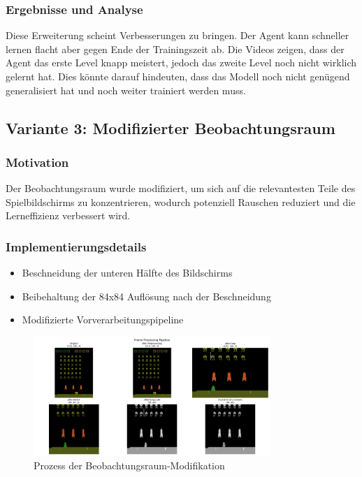 \documentclass{article}
\begin{document}
\subsubsection{Ergebnisse und Analyse}
Diese Erweiterung scheint Verbesserungen zu bringen. Der Agent kann schneller lernen flacht aber gegen Ende der Trainingszeit ab. Die Videos zeigen, dass der Agent das erste Level knapp meistert, jedoch das zweite Level noch nicht wirklich gelernt hat. Dies könnte darauf hindeuten, dass das Modell noch nicht genügend generalisiert hat und noch weiter trainiert werden muss.

\subsection{Variante 3: Modifizierter Beobachtungsraum}
\subsubsection{Motivation}
Der Beobachtungsraum wurde modifiziert, um sich auf die relevantesten Teile des Spielbildschirms zu konzentrieren, wodurch potenziell Rauschen reduziert und die Lerneffizienz verbessert wird.

\subsubsection{Implementierungsdetails}
\begin{itemize}
    \item Beschneidung der unteren Hälfte des Bildschirms
    \item Beibehaltung der 84x84 Auflösung nach der Beschneidung
    \item Modifizierte Vorverarbeitungspipeline
\end{itemize}

\begin{figure}[H]
    \centering
    \includegraphics[width=0.8\textwidth]{./Figure_1.png}
    \caption{Prozess der Beobachtungsraum-Modifikation}
\end{figure}
\end{document}
